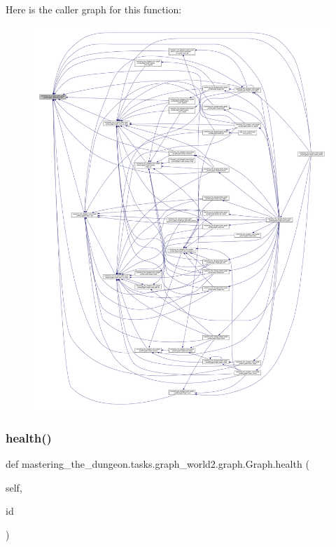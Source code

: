 Here is the caller graph for this function\+:
\nopagebreak
\begin{figure}[H]
\begin{center}
\leavevmode
\includegraphics[width=350pt]{classmastering__the__dungeon_1_1tasks_1_1graph__world2_1_1graph_1_1Graph_afeb622f5376ff440089d5c294cb8a358_icgraph}
\end{center}
\end{figure}
\mbox{\label{classmastering__the__dungeon_1_1tasks_1_1graph__world2_1_1graph_1_1Graph_a5c3264184a314f9c922dfa85adbc1317}} 
\subsubsection{\texorpdfstring{health()}{health()}}
{\footnotesize\ttfamily def mastering\+\_\+the\+\_\+dungeon.\+tasks.\+graph\+\_\+world2.\+graph.\+Graph.\+health (\begin{DoxyParamCaption}\item[{}]{self,  }\item[{}]{id }\end{DoxyParamCaption})}



